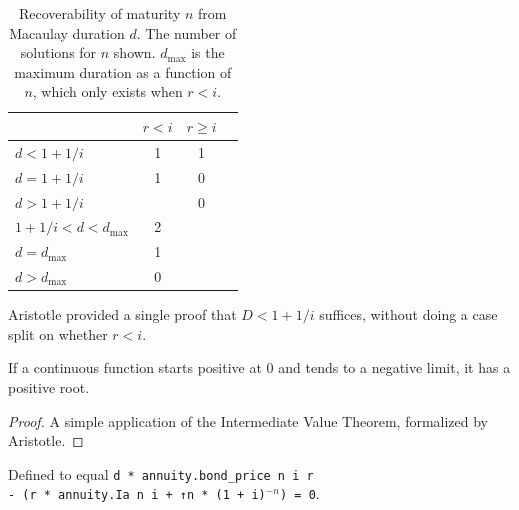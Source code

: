 \begin{table}[ht]
  \centering
  \caption{Recoverability of maturity $n$ from Macaulay duration $d$.
  The number of solutions for $n$ shown.
  $d_{\max}$ is the maximum duration as a function of $n$,
  which only exists when $r < i$.
  }
  \label{tab:duration-recoverability}
  \begin{tabular}{lccc}
    \hline
		  			& $r < i$ & $r \ge i$ \\
    \hline
    $d < 1 + 1/i$   & 1       & 1 \\
    $d = 1 + 1/i$   & 1 	  & 0 \\
    $d > 1 + 1/i$   &         & 0 \\
	$1 + 1/i < d < d_{\max}$ & 2 & \\
	$d = d_{\max}$ & 1 & \\
	$d > d_{\max}$ & 0 & \\
    \hline
  \end{tabular}
\end{table}



Aristotle \cite{achim2025aristotleimolevelautomatedtheorem} provided a single proof that $D<1+1/i$ suffices,
without doing a case split on whether $r<i$.

\begin{lemma}\label{AriMagic.exists_pos_root_of_limits}
	\leanok
If a continuous function starts positive at 0 and tends to a negative limit, it has a positive root.
\end{lemma}
\begin{proof}
	\leanok
	A simple application of the Intermediate Value Theorem, formalized by Aristotle.
\end{proof}

\begin{definition}\label{duration_equation}
	\leanok
	Defined to equal
   \verb!d * annuity.bond_price n i r! \\
   \verb!- (r * annuity.Ia n i + ↑n * (1 + i)!$^{-n}$\verb!) = 0!.
\end{definition}

